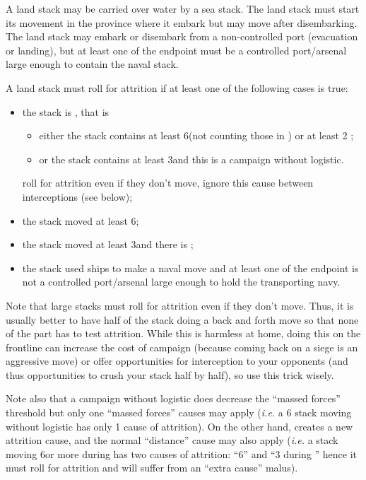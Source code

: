 A land stack may be carried over water by a sea stack. The land stack must
start its movement in the province where it embark but may move after
disembarking. The land stack may embark or disembark from a non-controlled
port (evacuation or landing), but at least one of the endpoint must be a
controlled port/arsenal large enough to contain the naval stack.

A land stack must roll for attrition if at least one of the following cases is
true:
\begin{itemize}
\item the stack is , that is
  \begin{itemize}
  \item either the stack contains at least 6\LD (not counting those in \Pasha)
    or at least 2 \Pashas;
  \item or the stack contains at least 3\LD and this is a campaign without
    logistic.
  \end{itemize}
   roll for attrition even if they don't move, ignore
  this cause between interceptions (see below);
\item the stack moved at least 6\MP;
\item the stack moved at least 3\MP and there is ;
\item the stack used ships to make a naval move and at least one of the
  endpoint is not a controlled port/arsenal large enough to hold the
  transporting navy.
\end{itemize}

Note that large stacks must roll for attrition even if they don't move. Thus,
it is usually better to have half of the stack doing a back and forth move so
that none of the part has to test attrition. While this is harmless at home,
doing this on the frontline can increase the cost of campaign (because coming
back on a siege is an aggressive move) or offer opportunities for interception
to your opponents (and thus opportunities to crush your stack half by half),
so use this trick wisely.

Note also that a campaign without logistic does decrease the ``massed forces''
threshold but only one ``massed forces'' causes may apply (\emph{i.e.} a 6\LD
stack moving without logistic has only 1 cause of attrition). On the other
hand,  creates a new attrition cause, and the normal
``distance'' cause may also apply (\emph{i.e.} a stack moving 6\MP or more
during  has two causes of attrition: ``6\MP'' and ``3\MP
during '' hence it must roll for attrition and will suffer
from an ``extra cause'' malus).

